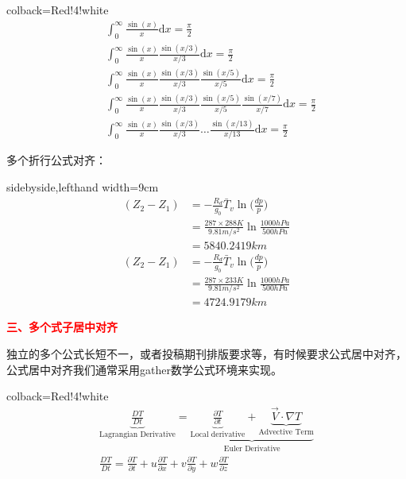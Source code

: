 \documentclass[UTF8,
no-math,
12pt,
openany,
table,
dvipsnames,
svgnames]{article}
\begin{document}
\begin{tcblisting}{colback=Red!4!white}
\begin{align}
    & \int_0^{\infty} \frac{\sin (x)}{x} \mathrm{d} x=\frac{\pi}{2} \\
    & \int_0^{\infty} \frac{\sin (x)}{x} \frac{\sin (x / 3)}{x / 3} \mathrm{d} x=\frac{\pi}{2} \\
    & \int_0^{\infty} \frac{\sin (x)}{x} \frac{\sin (x / 3)}{x / 3} \frac{\sin (x / 5)}{x / 5} \mathrm{d} x=\frac{\pi}{2} \\
    & \int_0^{\infty} \frac{\sin (x)}{x} \frac{\sin (x / 3)}{x / 3} \frac{\sin (x / 5)}{x / 5} \frac{\sin (x / 7)}{x / 7} \mathrm{d} x=\frac{\pi}{2}\\
    &\int_0^{\infty} \frac{\sin (x)}{x} \frac{\sin (x / 3)}{x / 3} \ldots \frac{\sin (x / 13)}{x / 13} \mathrm{d} x=\frac{\pi}{2}
\end{align}
\end{tcblisting}

多个折行公式对齐：
\begin{tcblisting}{sidebyside,lefthand width=9cm}
\begin{align*}
(Z_2-Z_1) &=-\frac{R_d}{g_0}\bar{T}_v
\ln\Big(\frac{dp}{p}\Big) \\
          &= \frac{287\times 288 K}{9.81 m/s^2} \ln\frac{1000 hPa}{500 hPa} \\
          &= 5840.2419km\\
(Z_2-Z_1) &=-\frac{R_d}{g_0}\bar{T}_v
\ln\Big(\frac{dp}{p}\Big) \\
          &= \frac{287\times 233 K}{9.81 m/s^2} \ln\frac{1000 hPa}{500 hPa} \\
          &= 4724.9179km
\end{align*}
\end{tcblisting}

\noindent
{\large\bf{\textcolor{Red}{三、多个式子居中对齐}}}

独立的多个公式长短不一，或者投稿期刊排版要求等，有时候要求公式居中对齐，公式居中对齐我们通常采用gather数学公式环境来实现。

\begin{tcblisting}{colback=Red!4!white}
\begin{gather*}
\underbrace{\frac{DT}{Dt}}_\text{Lagrangian Derivative} = \underbrace{\underbrace{\frac{\partial T}{\partial t}}_\text{Local derivative} + \underbrace{\vec{V}\cdot \nabla T}_\text{Advective Term}}_\text{Euler Derivative}\\
\frac{DT}{Dt} = \frac{\partial T}{\partial t} + u\frac{\partial T}{\partial x} + v\frac{\partial T}{\partial y} + w\frac{\partial T}{\partial z}
\end{gather*}
\end{tcblisting}
\end{document}
